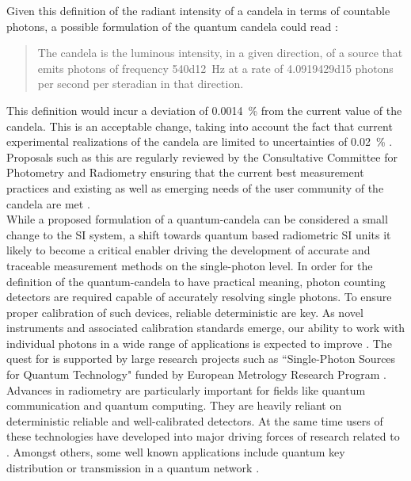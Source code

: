 	Given this definition of the radiant intensity of a candela in terms of countable photons, a possible formulation of the quantum candela could read \cite{Cheung2007}:

	\begin{quote}
		The candela is the luminous intensity, in a given direction, of a source that emits photons of frequency \SI{540d12}{\hertz} at a rate of \num{4.0919429d15} photons per second per steradian in that direction.
	\end{quote}

	This definition would incur a deviation of \SI{0.0014}{\percent} from the current value of the candela. This is an acceptable change, taking into account the fact that current experimental realizations of the candela are limited to uncertainties of \SI{0.02}{\percent} \cite{Cheung2007}. Proposals such as this are regularly reviewed by the Consultative Committee for Photometry and Radiometry ensuring that the current best measurement practices and existing as well as emerging needs of the user community of the candela are met \cite{zwinkels2010photometry}.
	\\
	While a proposed formulation of a quantum-candela can be considered a small change to the SI system, a shift towards quantum based radiometric SI units it likely to become a critical enabler driving the development of accurate and traceable measurement methods on the single-photon level. In order for the definition of the quantum-candela to have practical meaning, photon counting detectors are required capable of accurately resolving single photons. To ensure proper calibration of such devices, reliable deterministic \spss are key. As novel instruments and associated calibration standards emerge, our ability to work with individual photons in a wide range of applications is expected to improve \cite{buller2009single, eisaman2011invited, sangouard2012single, chunnilall2014metrology}. The quest for \spss is supported by large research projects such as ``Single-Photon Sources for Quantum Technology" funded by European Metrology Research Program \cite{SiquteProject,QuCandelaProject}.
	\\
	Advances in radiometry are particularly important for fields like quantum communication and quantum computing. They are heavily reliant on deterministic reliable \spss and well-calibrated detectors. At the same time users of these technologies have developed into major driving forces of research related to \spss \cite{scheel2009single, chunnilall2014metrology}. Amongst others, some well known applications include quantum key distribution \cite{bennett2014quantum, beveratos2002single, alleaume2004experimental} or transmission in a quantum network \cite{childress2006fault, bernien2012two, pfaff2014unconditional}.
